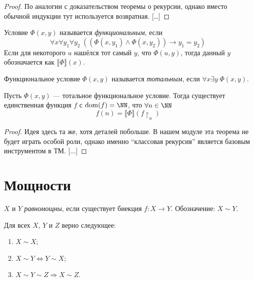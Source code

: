 \documentclass[12pt,a4paper]{article}
\DeclareMathOperator{\dom}{dom}
\begin{document}
    \begin{proof}
        По аналогии с доказательством теоремы о рекурсии, однако вместо обычной индукции тут используется возвратная. [\dots]
    \end{proof}

    \begin{definition}
        Условие $\Phi(x, y)$ называется \emph{функциональным}, если
        \[\forall x \forall y_1 \forall y_2\; ((\Phi(x, y_1) \wedge \Phi(x, y_2)) \rightarrow y_1 = y_2)\]
        Если для некоторого $u$ нашёлся тот самый $y$, что $\Phi(u, y)$, тогда данный $y$ обозначается как $\llbracket \Phi \rrbracket (x)$.

        Функциональное условие $\Phi(x, y)$ называется \emph{тотальным}, если $\forall x \exists y\; \Phi(x, y)$.
    \end{definition}

    \begin{theorem}
        Пусть $\Phi(x, y)$ --- тотальное функциональное условие. Тогда существует единственная функция $f$ с $\dom(f) = \NN$, что $\forall n \in \NN$
        \[f(n) = \llbracket \Phi \rrbracket (f\upharpoonright_n)\]
    \end{theorem}

    \begin{proof}
        Идея здесь та же, хотя деталей побольше. В нашем модуле эта теорема не будет играть особой роли, однако именно ``классовая рекурсия'' является базовым инструментом в ТМ. [...]
    \end{proof}

    \section{Мощности}

    \begin{definition}
        $X$ и $Y$ \emph{равномощны}, если существует биекция $f: X \to Y$. Обозначение: $X \sim Y$.
    \end{definition}

    \begin{theorem}
        Для всех $X$, $Y$ и $Z$ верно следующее:
        \begin{enumerate}
            \item $X \sim X$;
            \item $X \sim Y \Leftrightarrow Y \sim X$;
            \item $X \sim Y \sim Z \Rightarrow X \sim Z$.
        \end{enumerate}
    \end{theorem}
\end{document}
